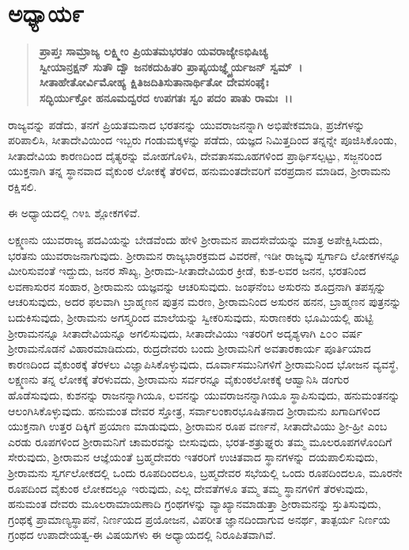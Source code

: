 \section*{ಅಧ್ಯಾಯ\enginline{-}೯}

\begin{verse}
\textbf{ಪ್ರಾಪ್ತಃ ಸಾಮ್ರಾಜ್ಯ ಲಕ್ಷ್ಮೀಂ ಪ್ರಿಯತಮಭರತಂ ಯವರಾಜ್ಯೇಽಭಿಷಿಚ್ಯ}\\\textbf{ಸ್ವೀಯಾನ್ರಕ್ಷನ್ ಸುತೌ ದ್ವೌ ಜನಕದುಹಿತರಿ ಪ್ರಾಪ್ಯಯಜ್ಞ್ಯೈರ್ಯಜನ್ ಸ್ವಮ್~।}\\\textbf{ಸೀತಾಹೇತೋರ್ವಿಮೋಹ್ಯ ಕ್ಷಿತಿಜದಿತಿಸುತಾನಾರ್ಥಿತೋ ದೇವಸಂಘೈಃ }\\\textbf{ಸದ್ಭಿರ್ಯುಕ್ತೋ ಹನೂಮದ್ವರದ ಉಪಗತಃ ಸ್ವಂ ಪದಂ ಪಾತು ರಾಮಃ~।।}
\end{verse}

ರಾಜ್ಯವನ್ನು ಪಡೆದು, ತನಗೆ ಪ್ರಿಯತಮನಾದ ಭರತನನ್ನು ಯುವರಾಜನನ್ನಾಗಿ ಅಭಿಷೇಕಮಾಡಿ, ಪ್ರಜೆಗಳನ್ನು ಪರಿಪಾಲಿಸಿ, ಸೀತಾದೇವಿಯಿಂದ ಇಬ್ಬರು ಗಂಡುಮಕ್ಕಳನ್ನು ಪಡೆದು, ಯಜ್ಞದ ನಿಮಿತ್ತದಿಂದ ತನ್ನನ್ನೇ ಪೂಜಿಸಿಕೊಂಡು, ಸೀತಾದೇವಿಯ ಕಾರಣದಿಂದ ದೈತ್ಯರನ್ನು ಮೋಹಗೊಳಿಸಿ, ದೇವತಾಸಮೂಹಗಳಿಂದ ಪ್ರಾರ್ಥಿಸಲ್ಪಟ್ಟು, ಸಜ್ಜನರಿಂದ ಯುಕ್ತನಾಗಿ ತನ್ನ ಸ್ಥಾನವಾದ ವೈಕುಂಠ ಲೋಕಕ್ಕೆ ತೆರಳಿದ, ಹನುಮಂತದೇವರಿಗೆ ವರಪ್ರದಾನ ಮಾಡಿದ, ಶ‍್ರೀರಾಮನು ರಕ್ಷಿಸಲಿ.

ಈ ಅಧ್ಯಾಯದಲ್ಲಿ ೧೪೩ ಶ್ಲೋಕಗಳಿವೆ.

ಲಕ್ಷ್ಮಣನು ಯುವರಾಜ್ಯ ಪದವಿಯನ್ನು ಬೇಡವೆಂದು ಹೇಳಿ ಶ‍್ರೀರಾಮನ ಪಾದಸೇವೆಯನ್ನು ಮಾತ್ರ ಅಪೇಕ್ಷಿಸಿದುದು, ಭರತನು ಯುವರಾಜನಾಗುವುದು. ಶ‍್ರೀರಾಮನ ರಾಜ್ಯಭಾರಕ್ರಮದ ವಿವರಣೆ, ಇಡೀ ರಾಜ್ಯವು ಸ್ವರ್ಗಾದಿ ಲೋಕಗಳನ್ನೂ ಮೀರಿಸುವಂತೆ ಇದ್ದುದು, ಜನರ ಸೌಖ್ಯ, ಶ‍್ರೀರಾಮ-ಸೀತಾದೇವಿಯರ ಕ್ರೀಡೆ, ಕುಶ-ಲವರ ಜನನ, ಭರತನಿಂದ ಲವಣಾಸುರನ ಸಂಹಾರ, ಶ‍್ರೀರಾಮನು ಯಜ್ಞವನ್ನು ಆಚರಿಸುವುದು. ಜಂಘನೆಂಬ ಅಸುರನು ಶೂದ್ರನಾಗಿ ತಪಸ್ಸನ್ನು ಆಚರಿಸುವುದು, ಅದರ ಫಲವಾಗಿ ಬ್ರಾಹ್ಮಣನ ಪುತ್ರನ ಮರಣ, ಶ‍್ರೀರಾಮನಿಂದ ಅಸುರನ ಹನನ, ಬ್ರಾಹ್ಮಣನ ಪುತ್ರನನ್ನು ಬದುಕಿಸುವುದು, ಶ‍್ರೀರಾಮನು ಅಗಸ್ತ್ಯರಿಂದ ಮಾಲೆಯನ್ನು ಸ್ವೀಕರಿಸುವುದು, ಸುರಾಣಕರು ಭೂಮಿಯಲ್ಲಿ ಹುಟ್ಟಿ ಶ‍್ರೀರಾಮನನ್ನೂ ಸೀತಾದೇವಿಯನ್ನೂ ಅಗಲಿಸುವುದು, ಸೀತಾದೇವಿಯು ಇತರರಿಗೆ ಅದೃಶ್ಯಳಾಗಿ ೭೦೦ ವರ್ಷ ಶ‍್ರೀರಾಮನೊಡನೆ ವಿಹಾರಮಾಡಿದುದು, ರುದ್ರದೇವರು ಬಂದು ಶ‍್ರೀರಾಮನಿಗೆ ಅವತಾರಕಾರ್ಯ ಪೂರ್ತಿಯಾದ ಕಾರಣದಿಂದ ವೈಕುಂಠಕ್ಕೆ ತೆರಳಲು ವಿಜ್ಞಾಪಿಸಿಕೊಳ್ಳುವುದು, ದೂರ್ವಾಸಮುನಿಗಳಿಗೆ ಶ‍್ರೀರಾಮನಿಂದ ಭೋಜನ ವ್ಯವಸ್ಥೆ, ಲಕ್ಷ್ಮಣನು ತನ್ನ ಲೋಕಕ್ಕೆ ತೆರಳುವದು, ಶ‍್ರೀರಾಮನು ಸರ್ವರನ್ನೂ ವೈಕುಂಠಲೋಕಕ್ಕೆ ಆಹ್ವಾನಿಸಿ ಡಂಗುರ ಹೊಡೆಸುವುದು, ಕುಶನನ್ನು ರಾಜನನ್ನಾಗಿಯೂ, ಲವನನ್ನು ಯುವರಾಜನನ್ನಾಗಿಯೂ ಸ್ಥಾಪಿಸುವುದು, ಹನುಮಂತನನ್ನು ಆಲಂಗಿಸಿಕೊಳ್ಳುವುದು. ಹನುಮಂತ ದೇವರ ಸ್ತೋತ್ರ, ಸರ್ವಾಲಂಕಾರಭೂಷಿತನಾದ ಶ‍್ರೀರಾಮನು ಖಗಾದಿಗಳಿಂದ ಯುಕ್ತನಾಗಿ ಉತ್ತರ ದಿಕ್ಕಿಗೆ ಪ್ರಯಾಣ ಮಾಡುವುದು, ಶ‍್ರೀರಾಮನ ರೂಪ ವರ್ಣನೆ, ಸೀತಾದೇವಿಯು ಶ‍್ರೀ-ಹ್ರೀ ಎಂಬ ಎರಡು ರೂಪಗಳಿಂದ ಶ‍್ರೀರಾಮನಿಗೆ ಚಾಮರವನ್ನು ಬೀಸುವುದು, ಭರತ-ಶತ್ರುಘ್ನರು ತಮ್ಮ ಮೂಲರೂಪಗಳೊಂದಿಗೆ ಸೇರುವುದು, ಶ‍್ರೀರಾಮನ ಆಜ್ಞೆಯಂತೆ ಬ್ರಹ್ಮದೇವರು ಇತರರಿಗೆ ಉಚಿತವಾದ ಸ್ಥಾನಗಳನ್ನು ದಯಪಾಲಿಸುವುದು, ಶ‍್ರೀರಾಮನು ಸ್ವರ್ಗಲೋಕದಲ್ಲಿ ಒಂದು ರೂಪದಿಂದಲೂ, ಬ್ರಹ್ಮದೇವರ ಸಭೆಯಲ್ಲಿ ಒಂದು ರೂಪದಿಂದಲೂ, ಮೂರನೇ ರೂಪದಿಂದ ವೈಕುಂಠ ಲೋಕದಲ್ಲೂ ಇರುವುದು, ಎಲ್ಲ ದೇವತೆಗಳೂ ತಮ್ಮ ತಮ್ಮ ಸ್ಥಾನಗಳಿಗೆ ತೆರಳುವುದು, ಹನುಮಂತ ದೇವರು ಮೂಲರಾಮಾಯಣಾದಿ ಗ್ರಂಥಗಳನ್ನು ವ್ಯಾಖ್ಯಾನಮಾಡುತ್ತಾ ಶ‍್ರೀರಾಮನನ್ನು ಸ್ತುತಿಸುವುದು, ಗ್ರಂಥಕ್ಕೆ ಪ್ರಾಮಾಣ್ಯಸ್ಥಾಪನೆ, ನಿರ್ಣಯದ ಪ್ರಯೋಜನ, ವಿಪರೀತ ಜ್ಞಾನದಿಂದಾಗುವ ಅನರ್ಥ, ತಾತ್ಪರ್ಯ ನಿರ್ಣಯ ಗ್ರಂಥದ ಉಪಾದೇಯತ್ವ-ಈ ವಿಷಯಗಳು ಈ ಅಧ್ಯಾಯದಲ್ಲಿ ನಿರೂಪಿತವಾಗಿವೆ.


